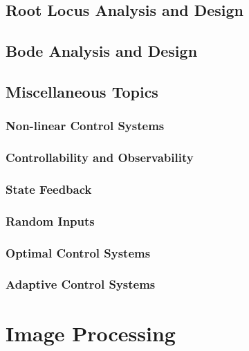 \documentclass[11pt]{book}
\begin{document}
\section{Root Locus Analysis and Design}

\section{Bode Analysis and Design}

\section{Miscellaneous Topics}

\subsection{Non-linear Control Systems}

\subsection{Controllability and Observability}

\subsection{State Feedback}

\subsection{Random Inputs}

\subsection{Optimal Control Systems}

\subsection{Adaptive Control Systems}

\chapter{Image Processing}

\backmatter
\end{document}

